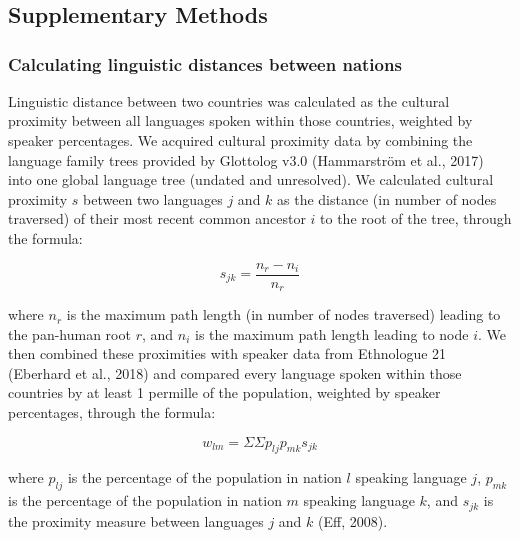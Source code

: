 \documentclass[english,man,floatsintext]{apa6}
\begin{document}
\renewcommand{\appendixname}{Supplementary Materials}
\renewcommand{\thefigure}{S\arabic{figure}} \setcounter{figure}{0}
\renewcommand{\thetable}{S\arabic{table}} \setcounter{table}{0}
\renewcommand{\theequation}{S\arabic{table}} \setcounter{equation}{0}

\hypertarget{section}{%
\section{}\label{section}}

\hypertarget{supplementary-methods}{%
\subsection{Supplementary Methods}\label{supplementary-methods}}

\hypertarget{calculating-linguistic-distances-between-nations}{%
\subsubsection{Calculating linguistic distances between nations}\label{calculating-linguistic-distances-between-nations}}

Linguistic distance between two countries was calculated as the cultural proximity between all languages spoken within those countries, weighted by speaker percentages. We acquired cultural proximity data by combining the language family trees provided by Glottolog v3.0 (Hammarström et al., 2017) into one global language tree (undated and unresolved). We calculated cultural proximity \(s\) between two languages \(j\) and \(k\) as the distance (in number of nodes traversed) of their most recent common ancestor \(i\) to the root of the tree, through the formula:

\[
s_{jk} = \frac{n_{r}-n_{i}}{n_{r}}
\]

where \(n_{r}\) is the maximum path length (in number of nodes traversed) leading to the pan-human root \(r\), and \(n_{i}\) is the maximum path length leading to node \(i\). We then combined these proximities with speaker data from Ethnologue 21 (Eberhard et al., 2018) and compared every language spoken within those countries by at least 1 permille of the population, weighted by speaker percentages, through the formula:

\[
w_{lm} = {\Sigma}{\Sigma}p_{lj}p_{mk}s_{jk}
\]

where \(p_{lj}\) is the percentage of the population in nation \(l\) speaking language \(j\), \(p_{mk}\) is the percentage of the population in nation \(m\) speaking language \(k\), and \(s_{jk}\) is the proximity measure between languages \(j\) and \(k\) (Eff, 2008).
\end{document}
